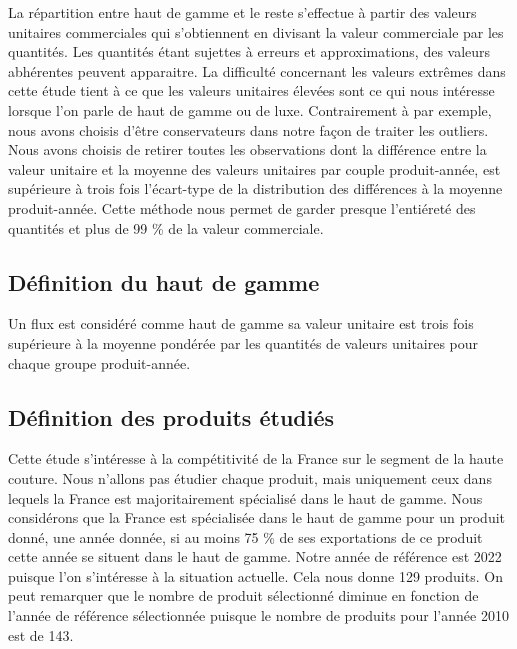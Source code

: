 \documentclass[french,10pt,a4paper]{article}
\begin{document}
La répartition entre haut de gamme et le reste s'effectue à partir des valeurs unitaires commerciales qui s'obtiennent en divisant la valeur commerciale par les quantités. Les quantités étant sujettes à erreurs et approximations, des valeurs abhérentes peuvent apparaitre. La difficulté concernant les valeurs extrêmes dans cette étude tient à ce que les valeurs unitaires élevées sont ce qui nous intéresse lorsque l'on parle de haut de gamme ou de luxe. Contrairement à \cite{Fontagne2013} par exemple, nous avons choisis d'être conservateurs dans notre façon de traiter les outliers. Nous avons choisis de retirer toutes les observations dont la différence entre la valeur unitaire et la moyenne des valeurs unitaires par couple produit-année, est supérieure à trois fois l'écart-type de la distribution des différences à la moyenne produit-année. Cette méthode nous permet de garder presque l'entiéreté des quantités et plus de 99 \% de la valeur commerciale.


\subsection{Définition du haut de gamme}

Un flux est considéré comme haut de gamme sa valeur unitaire est trois fois supérieure à la moyenne pondérée par les quantités de valeurs unitaires pour chaque groupe produit-année.

\subsection{Définition des produits étudiés}

Cette étude s'intéresse à la compétitivité de la France sur le segment de la haute couture. Nous n'allons pas étudier chaque produit, mais uniquement ceux dans lequels la France est majoritairement spécialisé dans le haut de gamme. Nous considérons que la France est spécialisée dans le haut de gamme pour un produit donné, une année donnée, si au moins 75 \% de ses exportations de ce produit cette année se situent dans le haut de gamme. Notre année de référence est 2022 puisque l'on s'intéresse à la situation actuelle. Cela nous donne 129 produits. On peut remarquer que le nombre de produit sélectionné diminue en fonction de l'année de référence sélectionnée puisque le nombre de produits pour l'année 2010 est de 143.
\end{document}
